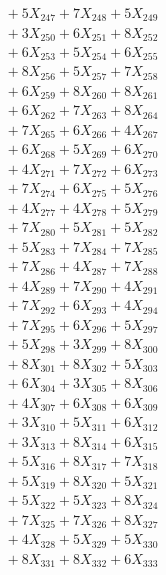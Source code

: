 \documentclass[a4paper,10pt]{article}
\begin{document}
{\begin{align}
&\;  + 5 X_{247} + 7 X_{248} + 5 X_{249} \\[0.5ex]\allowbreak
&\;  + 3 X_{250} + 6 X_{251} + 8 X_{252} \\[0.3ex]
&\;  + 6 X_{253} + 5 X_{254} + 6 X_{255} \\[0.3ex]
&\;  + 8 X_{256} + 5 X_{257} + 7 X_{258} \\[0.3ex]
&\;  + 6 X_{259} + 8 X_{260} + 8 X_{261} \\[0.3ex]
&\;  + 6 X_{262} + 7 X_{263} + 8 X_{264} \\[0.3ex]
&\;  + 7 X_{265} + 6 X_{266} + 4 X_{267} \\[0.3ex]
&\;  + 6 X_{268} + 5 X_{269} + 6 X_{270} \\[0.3ex]
&\;  + 4 X_{271} + 7 X_{272} + 6 X_{273} \\[0.3ex]
&\;  + 7 X_{274} + 6 X_{275} + 5 X_{276} \\[0.3ex]
&\;  + 4 X_{277} + 4 X_{278} + 5 X_{279} \\[0.5ex]\allowbreak
&\;  + 7 X_{280} + 5 X_{281} + 5 X_{282} \\[0.3ex]
&\;  + 5 X_{283} + 7 X_{284} + 7 X_{285} \\[0.3ex]
&\;  + 7 X_{286} + 4 X_{287} + 7 X_{288} \\[0.3ex]
&\;  + 4 X_{289} + 7 X_{290} + 4 X_{291} \\[0.3ex]
&\;  + 7 X_{292} + 6 X_{293} + 4 X_{294} \\[0.3ex]
&\;  + 7 X_{295} + 6 X_{296} + 5 X_{297} \\[0.3ex]
&\;  + 5 X_{298} + 3 X_{299} + 8 X_{300} \\[0.3ex]
&\;  + 8 X_{301} + 8 X_{302} + 5 X_{303} \\[0.3ex]
&\;  + 6 X_{304} + 3 X_{305} + 8 X_{306} \\[0.3ex]
&\;  + 4 X_{307} + 6 X_{308} + 6 X_{309} \\[0.5ex]\allowbreak
&\;  + 3 X_{310} + 5 X_{311} + 6 X_{312} \\[0.3ex]
&\;  + 3 X_{313} + 8 X_{314} + 6 X_{315} \\[0.3ex]
&\;  + 5 X_{316} + 8 X_{317} + 7 X_{318} \\[0.3ex]
&\;  + 5 X_{319} + 8 X_{320} + 5 X_{321} \\[0.3ex]
&\;  + 5 X_{322} + 5 X_{323} + 8 X_{324} \\[0.3ex]
&\;  + 7 X_{325} + 7 X_{326} + 8 X_{327} \\[0.3ex]
&\;  + 4 X_{328} + 5 X_{329} + 5 X_{330} \\[0.3ex]
&\;  + 8 X_{331} + 8 X_{332} + 6 X_{333} \\[0.3ex]

\end{align}}
\end{document}
